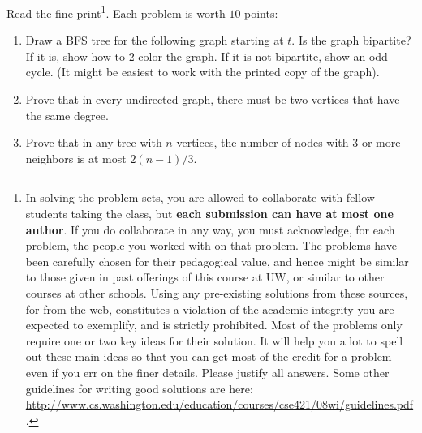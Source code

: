 \documentclass[11pt]{article}
\begin{document}



Read the fine print\footnote{In solving the problem sets, you are allowed to collaborate with fellow students taking the class, but \textbf{each submission can have at most one author}. If you do collaborate in any way, you must acknowledge, for each problem, the people you worked with on that problem.
The problems have been carefully chosen for their pedagogical value, and hence might be similar to those given in past offerings of this course at UW, or similar to other courses at other schools.  Using any pre-existing solutions from these sources, for from the web, constitutes a violation of the academic integrity you are expected to exemplify, and is strictly prohibited.
Most of the problems only require one or two key ideas for their solution.  It will help you a lot to spell out these main ideas so that you can get most of the credit for a problem even if you err on the finer details. Please justify all answers. Some other guidelines for writing good solutions are here: \url{http://www.cs.washington.edu/education/courses/cse421/08wi/guidelines.pdf}.}. Each problem is worth $10$ points:

\begin{enumerate}
\item Draw a BFS tree for the following graph starting at $t$. Is the graph bipartite? If it is, show how to 2-color the graph. If it is not bipartite, show an odd cycle. (It might be easiest to work with the printed copy of the graph). 
\item Prove that in every undirected graph, there must be two vertices that have the same degree. 
\item Prove that in any tree with $n$ vertices, the number of nodes with $3$ or more neighbors is at most $2(n-1)/3$. 
\end{enumerate}
\end{document}
